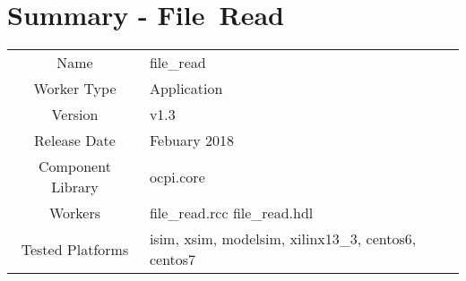 \documentclass{article}
\author{} %
\date{Version \docVersion} %
\title{\docTitle}
\def\docVersion{1.3}
\def\comp{file\_read}
\def\Comp{File\ Read }
\begin{document}
\section*{Summary - \Comp}
\begin{tabular}{|c|M{13.5cm}|}
	\hline
	                  &                                                                                \\
	\hline
	Name              & \comp                                                                          \\
	\hline
	Worker Type       & Application                                                                    \\
	\hline
	Version           &  v\docVersion \\
	\hline
	Release Date      &  Febuary 2018 \\
	\hline
	Component Library &   ocpi.core\\
	\hline
	Workers           &  file\_read.rcc file\_read.hdl\\
	\hline
	Tested Platforms  &  isim, xsim, modelsim, xilinx13\_3, centos6, centos7\\
	\hline
\end{tabular}
\end{document}
